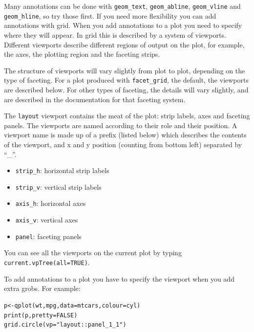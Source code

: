 Many annotations can be done with {\tt geom\_text}, {\tt geom\_abline}, {\tt geom\_vline} and {\tt geom\_hline}, so try those first.  If you need more flexibility you can add annotations with grid.  When you add annotations to a plot you need to specify where they will appear.  In grid this is described by a system of viewports.  Different viewports describe different regions of output on the plot, for example, the axes, the plotting region and the faceting strips.

The structure of viewports will vary slightly from plot to plot, depending on the type of faceting.  For a plot produced with {\tt facet\_grid}, the default, the viewports are described below.  For other types of faceting, the details will vary slightly, and are described in the documentation for that faceting system.  

The {\tt layout} viewport contains the meat of the plot: strip labels, axes and faceting panels.  The viewports are named according to their role and their position.  A viewport name is made up of a prefix (listed below) which describes the contents of the viewport, and x and y position (counting from bottom left) separated by ``\_''.

\begin{itemize}
  \item {\tt strip\_h}: horizontal strip labels
  \item {\tt strip\_v}: vertical strip labels
  \item {\tt axis\_h}: horizontal axes
  \item {\tt axis\_v}: vertical axes
  \item {\tt panel}: faceting panels
\end{itemize}

% 

You can see all the viewports on the current plot by typing {\tt current.vpTree(all=TRUE)}.

To add annotations to a plot you have to specify the viewport when you add extra grobs.  For example:

\begin{alltt}
p <- qplot(wt, mpg, data=mtcars, colour=cyl)
print(p, pretty=FALSE)
grid.circle(vp="layout::panel_1_1")
\end{alltt}


